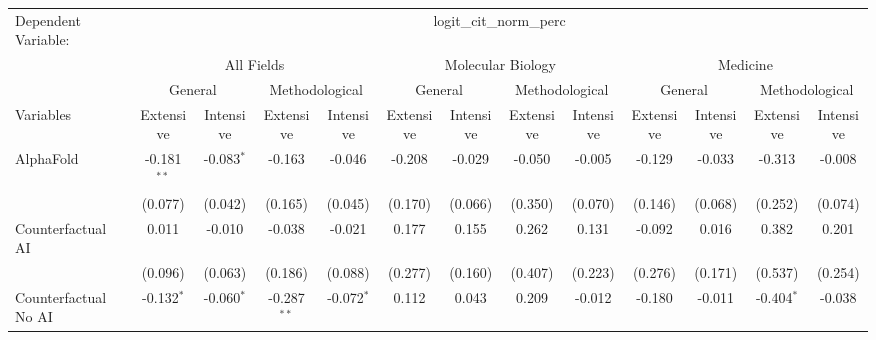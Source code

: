 \begingroup
\centering
\begin{tabular}{lcccccccccccc}
   \tabularnewline \midrule \midrule
   Dependent Variable: & \multicolumn{12}{c}{logit\_cit\_norm\_perc}\\
 & \multicolumn{4}{c}{All Fields} & \multicolumn{4}{c}{Molecular Biology} & \multicolumn{4}{c}{Medicine} \\
\cmidrule(lr){2-5} \cmidrule(lr){6-9} \cmidrule(lr){10-13}
 & \multicolumn{2}{c}{General} & \multicolumn{2}{c}{Methodological} & \multicolumn{2}{c}{General} & \multicolumn{2}{c}{Methodological} & \multicolumn{2}{c}{General} & \multicolumn{2}{c}{Methodological} \\
\cmidrule(lr){2-3} \cmidrule(lr){4-5} \cmidrule(lr){6-7} \cmidrule(lr){8-9} \cmidrule(lr){10-11} \cmidrule(lr){12-13}
Variables & \multicolumn{1}{c}{Extensive} & \multicolumn{1}{c}{Intensive} & \multicolumn{1}{c}{Extensive} & \multicolumn{1}{c}{Intensive} & \multicolumn{1}{c}{Extensive} & \multicolumn{1}{c}{Intensive} & \multicolumn{1}{c}{Extensive} & \multicolumn{1}{c}{Intensive} & \multicolumn{1}{c}{Extensive} & \multicolumn{1}{c}{Intensive} & \multicolumn{1}{c}{Extensive} & \multicolumn{1}{c}{Intensive} \\
\cmidrule(lr){1-1}\cmidrule(lr){2-2} \cmidrule(lr){3-3} \cmidrule(lr){4-4} \cmidrule(lr){5-5} \cmidrule(lr){6-6} \cmidrule(lr){7-7} \cmidrule(lr){8-8} \cmidrule(lr){9-9} \cmidrule(lr){10-10} \cmidrule(lr){11-11} \cmidrule(lr){12-12} \cmidrule(lr){13-13}
   AlphaFold                                & -0.181$^{**}$ & -0.083$^{*}$ & -0.163        & -0.046       & -0.208  & -0.029  & -0.050  & -0.005  & -0.129  & -0.033  & -0.313       & -0.008\\   
                                            & (0.077)       & (0.042)      & (0.165)       & (0.045)      & (0.170) & (0.066) & (0.350) & (0.070) & (0.146) & (0.068) & (0.252)      & (0.074)\\   
   Counterfactual AI                        & 0.011         & -0.010       & -0.038        & -0.021       & 0.177   & 0.155   & 0.262   & 0.131   & -0.092  & 0.016   & 0.382        & 0.201\\   
                                            & (0.096)       & (0.063)      & (0.186)       & (0.088)      & (0.277) & (0.160) & (0.407) & (0.223) & (0.276) & (0.171) & (0.537)      & (0.254)\\   
   Counterfactual No AI                     & -0.132$^{*}$  & -0.060$^{*}$ & -0.287$^{**}$ & -0.072$^{*}$ & 0.112   & 0.043   & 0.209   & -0.012  & -0.180  & -0.011  & -0.404$^{*}$ & -0.038\\   

\end{tabular}

